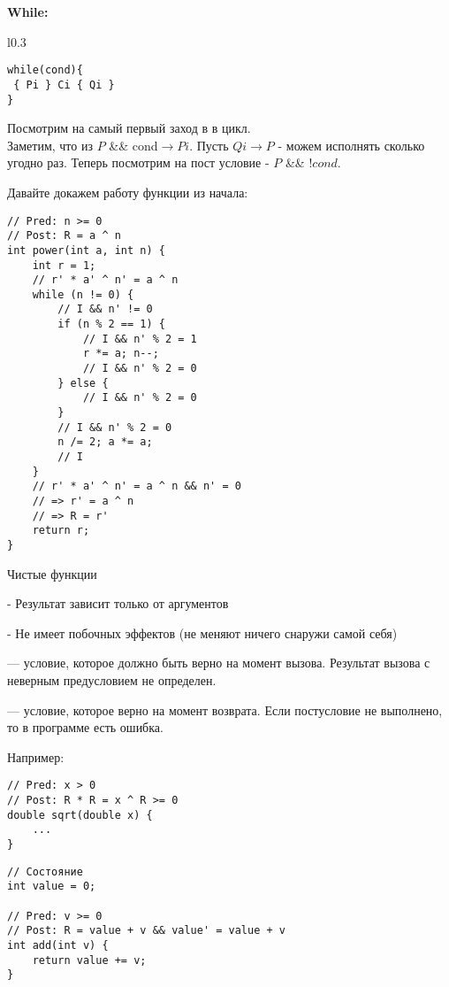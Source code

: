 \textbf{While:} 

\begin{wrapfigure}{l}{0.3\linewidth} 
   \begin{verbatim}
while(cond){
 { Pi } Ci { Qi } 
}
\end{verbatim}
\end{wrapfigure}

Посмотрим на самый первый заход в в цикл. \\ 
Заметим, что из $P$ \&\& cond$ \rightarrow Pi$. Пусть $Qi \rightarrow P$ - можем исполнять сколько угодно раз. Теперь посмотрим на пост условие -  $P$ \&\& $!cond$.

Давайте докажем работу функции из начала:
\begin{verbatim}
// Pred: n >= 0
// Post: R = a ^ n
int power(int a, int n) {
    int r = 1;
    // r' * a' ^ n' = a ^ n
    while (n != 0) {
        // I && n' != 0
        if (n % 2 == 1) {
            // I && n' % 2 = 1
            r *= a; n--;
            // I && n' % 2 = 0
        } else {
            // I && n' % 2 = 0
        }
        // I && n' % 2 = 0
        n /= 2; a *= a;
        // I
    }
    // r' * a' ^ n' = a ^ n && n' = 0
    // => r' = a ^ n
    // => R = r'
    return r;
}
\end{verbatim}    


Чистые функции

- Результат зависит только от аргументов

- Не имеет побочных эффектов (не меняют ничего снаружи самой себя)

 --- условие, которое должно быть верно на момент вызова. Результат вызова с неверным предусловием не определен.

 --- условие, которое верно на момент возврата. Если постусловие не выполнено, то в программе есть ошибка.

Например:
\begin{verbatim}
// Pred: x > 0
// Post: R * R = x ^ R >= 0
double sqrt(double x) {
    ...
}
\end{verbatim}  

\begin{verbatim}
// Состояние
int value = 0;

// Pred: v >= 0
// Post: R = value + v && value' = value + v
int add(int v) {
    return value += v;
}

\end{verbatim}  

